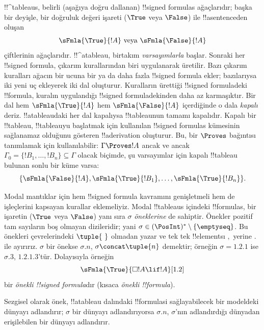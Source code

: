 \documentclass[../../../include/open-logic-section]{subfiles}
\begin{document}


!!^{tableau}s, belirli (aşağıya doğru dallanan) !!{signed formula}s
ağaçlarıdır; başka bir deyişle, bir doğruluk değeri işareti ($\True$ veya
$\False$) ile !!a{sentence}{}den oluşan
\[
\sFmla{\True}{!A} \text{ veya } \sFmla{\False}{!A}
\]
çiftlerinin ağaçlarıdır. !!^a{tableau}, birtakım \emph{varsayımlarla}
başlar. Sonraki her !!{signed formula}, çıkarım kurallarından biri uygulanarak
üretilir. Bazı çıkarım kuralları ağacın bir ucuna bir ya da daha fazla
!!{signed formula} ekler; bazılarıysa iki yeni uç ekleyerek iki dal oluşturur.
Kuralların ürettiği !!{signed formula}{}deki !!{formula}, kuralın uygulandığı
!!{signed formula}{}dekinden daha az karmaşıktır. Bir dal hem
$\sFmla{\True}{!A}$ hem $\sFmla{\False}{!A}$ içerdiğinde o dala
\emph{kapalı} deriz. !!a{tableau}{}daki her dal kapalıysa !!{tableau}{}nun tamamı
kapalıdır. Kapalı bir !!{tableau}, !!{tableau}{}yu başlatmak için kullanılan
!!{signed formula}s kümesinin sağlanamaz olduğunu gösteren !!a{derivation}
oluşturur. Bu, bir $\Proves$ bağıntısı tanımlamak için kullanılabilir:
$\Gamma \Proves !A$ ancak ve ancak $\Gamma_0 = \{!B_1,
\dots, !B_n\} \subseteq \Gamma$ olacak biçimde, şu varsayımlar için kapalı
!!{tableau} bulunan sonlu bir küme varsa:
\[
\{\sFmla{\False}{!A}, \sFmla{\True}{!B_1}, \dots, \sFmla{\True}{!B_n}\}.
\]

Modal mantıklar için hem !!{signed formula} kavramını genişletmeli hem de
 işleçlerini kapsayan kurallar eklemeliyiz. Modal
!!{tableau}s içindeki !!{formula}s, bir işaretin ($\True$ veya $\False$) yanı
sıra $\sigma$ \emph{öneklerine} de sahiptir. Önekler pozitif tam sayıların
boş olmayan dizileridir; yani $\sigma \in (\PosInt)^* \setminus
\{\emptyseq\}$. Bu önekleri çevrelerindeki $\tuple{\ }$ olmadan yazar ve
tek tek !!{element}s{}ı $,$ yerine $.$ ile ayırırız. $\sigma$ bir önekse
$\sigma.n$, $\sigma \concat \tuple{n}$ demektir; örneğin
$\sigma = 1.2.1$ ise $\sigma.3$, $1.2.1.3$'tür. Dolayısıyla örneğin
\[
\sFmla{\True}{\Box !A \lif !A}[1.2]
\]
bir \emph{önekli !!{signed formula}}dır (kısaca \emph{önekli
  !!{formula}}).

Sezgisel olarak önek, !!a{tableau} dalındaki !!{formula}s{}i sağlayabilecek bir
modeldeki dünyayı adlandırır; $\sigma$ bir dünyayı adlandırıyorsa $\sigma.n$,
$\sigma$'nın adlandırdığı dünyadan erişilebilen bir dünyayı adlandırır.
\end{document}

